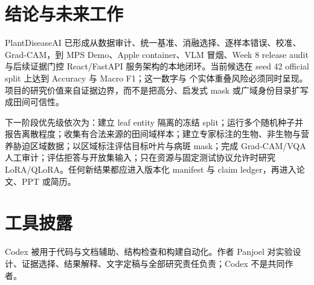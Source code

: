 \documentclass[UTF8,11pt]{ctexart}
\begin{document}
\section{结论与未来工作}

PlantDiseaseAI 已形成从数据审计、统一基准、消融选择、逐样本错误、校准、Grad-CAM，到 MPS Demo、Apple container、VLM 冒烟、Week 8 release audit 与后续证据门控 React/FastAPI 服务架构的本地闭环。当前候选在 seed 42 official split 上达到 \PDAFinalAccuracy{} Accuracy 与 \PDAFinalMacroFOne{} Macro F1；这一数字与 \PDAOfficialOverlap{} 个实体重叠风险必须同时呈现。项目的研究价值来自证据边界，而不是把高分、启发式 mask 或广域身份目录扩写成田间可信性。

下一阶段优先级依次为：建立 leaf entity 隔离的冻结 split；运行多个随机种子并报告离散程度；收集有合法来源的田间域样本；建立专家标注的生物、非生物与营养胁迫区域数据；以区域标注评估目标叶片与病斑 mask；完成 Grad-CAM/VQA 人工审计；评估拒答与开放集输入；只在资源与固定测试协议允许时研究 LoRA/QLoRA。任何新结果都应进入版本化 manifest 与 claim ledger，再进入论文、PPT 或简历。

\section*{工具披露}

Codex 被用于代码与文档辅助、结构检查和构建自动化。作者 Panjoel 对实验设计、证据选择、结果解释、文字定稿与全部研究责任负责；Codex 不是共同作者。



\end{document}
